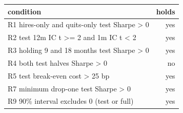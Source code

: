 \begin{tabular}{lr}
\toprule
condition & holds \\
\midrule
R1 hires-only and quits-only test Sharpe > 0 & yes \\
R2 test 12m IC t >= 2 and 1m IC t < 2 & yes \\
R3 holding 9 and 18 months test Sharpe > 0 & yes \\
R4 both test halves Sharpe > 0 & no \\
R5 test break-even cost > 25 bp & yes \\
R7 minimum drop-one test Sharpe > 0 & yes \\
R9 90\% interval excludes 0 (test or full) & yes \\
\bottomrule
\end{tabular}

